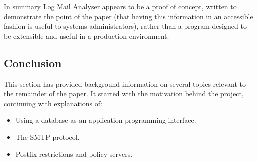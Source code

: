 \documentclass[a4paper,12pt,draft]{article}
\begin{document}
In summary Log Mail Analyser appears to be a proof of concept, written to
demonstrate the point of the paper (that having this information in an
accessible fashion is useful to systems administrators), rather than a
program designed to be extensible and useful in a production environment.

%

\subsection{Conclusion}

This section has provided background information on several topics relevant
to the remainder of the paper.  It started with the motivation behind the
project, continuing with explanations of:

\begin{itemize}

    \item Using a database as an application programming interface.

    \item The SMTP protocol.

    \item Postfix restrictions and policy servers.

\end{itemize}
\end{document}
